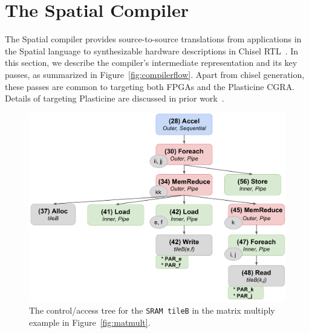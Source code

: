 \section{The Spatial Compiler}
\label{compiler}

The Spatial compiler provides source-to-source translations from applications in the Spatial language to synthesizable hardware descriptions in Chisel RTL~\cite{chisel}.
In this section, we describe the compiler's intermediate representation and its key passes, as summarized in Figure~\ref{fig:compilerflow}.
Apart from chisel generation, these passes are common to targeting both FPGAs and the Plasticine CGRA. Details of targeting Plasticine are discussed in prior work~\cite{plasticine}.



\begin{figure}
\includegraphics[clip, width=0.9\columnwidth]{figs/control_tree_gemm.pdf}
\vspace{-10pt}
\caption{The control/access tree for the \texttt{\small{SRAM tileB}} in the matrix multiply example in Figure~\ref{fig:matmult}.
\vspace{-5pt}
}
\label{fig:controlTree}
\end{figure}

